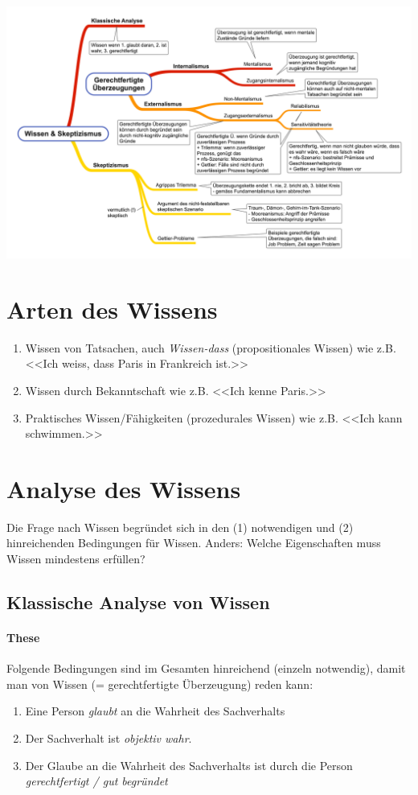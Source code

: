 \documentclass[../main.tex]{subfiles}
\begin{document}
\includegraphics[width=\textwidth]{images/Wissen_und_Skeptizismus_Uebersicht.png}

\section{Arten des Wissens}
\begin{enumerate}
	\item Wissen von Tatsachen, auch \textit{Wissen-dass} (propositionales Wissen) wie z.B. <<Ich weiss, dass Paris in Frankreich ist.>>
	\item Wissen durch Bekanntschaft wie z.B. <<Ich kenne Paris.>>
	\item Praktisches Wissen/Fähigkeiten (prozedurales Wissen) wie z.B. <<Ich kann schwimmen.>>
\end{enumerate}

\section{Analyse des Wissens}
Die Frage nach Wissen begründet sich in den (1) notwendigen und (2) hinreichenden Bedingungen für Wissen. Anders: Welche Eigenschaften muss Wissen mindestens erfüllen? 
\subsection{Klassische Analyse von Wissen}
\paragraph{These} Folgende Bedingungen sind im Gesamten hinreichend (einzeln notwendig), damit man von Wissen (= gerechtfertigte Überzeugung) reden kann:
\begin{enumerate}
	\item Eine Person \textit{glaubt} an die Wahrheit des Sachverhalts
	\item Der Sachverhalt ist \textit{objektiv wahr}.
	\item Der Glaube an die Wahrheit des Sachverhalts ist durch die Person \textit{gerechtfertigt / gut begründet}
\end{enumerate}
\end{document}
